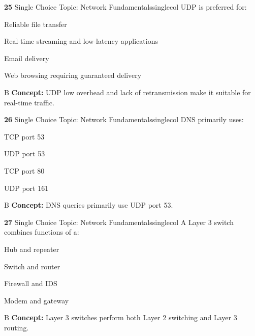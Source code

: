 \documentclass[10pt,a4paper]{article}
\begin{document}
\begin{qcard}{\color{white}\textbf{25} \hfill \small Single Choice \textbar{} Topic: Network Fundamentals}{singlecol}
UDP is preferred for:

\begin{qoptions}
\item Reliable file transfer
\item Real-time streaming and low-latency applications
\item Email delivery
\item Web browsing requiring guaranteed delivery
\end{qoptions}
\begin{explainbox}{B}
\textbf{Concept:} UDP low overhead and lack of retransmission make it suitable for real-time traffic.
\end{explainbox}
\end{qcard}

\begin{qcard}{\color{white}\textbf{26} \hfill \small Single Choice \textbar{} Topic: Network Fundamentals}{singlecol}
DNS primarily uses:

\begin{qoptions}
\item TCP port 53
\item UDP port 53
\item TCP port 80
\item UDP port 161
\end{qoptions}
\begin{explainbox}{B}
\textbf{Concept:} DNS queries primarily use UDP port 53.
\end{explainbox}
\end{qcard}

\begin{qcard}{\color{white}\textbf{27} \hfill \small Single Choice \textbar{} Topic: Network Fundamentals}{singlecol}
A Layer 3 switch combines functions of a:

\begin{qoptions}
\item Hub and repeater
\item Switch and router
\item Firewall and IDS
\item Modem and gateway
\end{qoptions}
\begin{explainbox}{B}
\textbf{Concept:} Layer 3 switches perform both Layer 2 switching and Layer 3 routing.
\end{explainbox}
\end{qcard}
\end{document}
